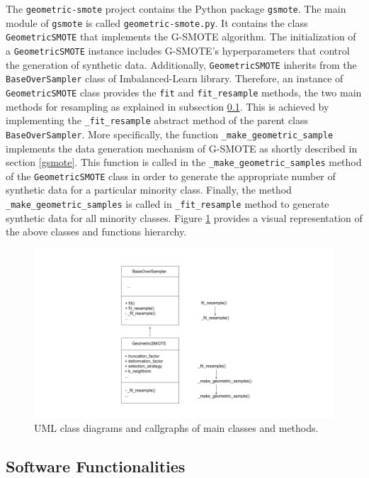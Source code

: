 \documentclass[preprint,12pt, a4paper]{elsarticle}
\begin{document}
The \texttt{geometric-smote} project contains the Python package \texttt{gsmote}. The main module of \texttt{gsmote} is called \texttt{geometric-smote.py}. It contains the class \texttt{GeometricSMOTE} that implements the G-SMOTE algorithm. The initialization of a \texttt{GeometricSMOTE} instance includes G-SMOTE's hyperparameters that control the generation of synthetic data. Additionally, \texttt{GeometricSMOTE} inherits from the \texttt{BaseOverSampler} class of Imbalanced-Learn library. Therefore, an instance of \texttt{GeometricSMOTE} class provides the \texttt{fit} and \texttt{fit\_resample} methods, the two main methods for resampling as explained in subsection \ref{functionality}. This is achieved by implementing the \texttt{\_fit\_resample} abstract method of the parent class \texttt{BaseOverSampler}. More specifically, the function \texttt{\_make\_geometric\_sample} implements the data generation mechanism of G-SMOTE as shortly described in section \ref{gsmote}. This function is called in the \texttt{\_make\_geometric\_samples} method of the \texttt{GeometricSMOTE} class in order to generate the appropriate number of synthetic data for a particular minority class. Finally, the method \texttt{\_make\_geometric\_samples} is called in \texttt{\_fit\_resample} method to generate synthetic data for all minority classes. Figure \ref{fig:class_diagram} provides a visual representation of the above classes and functions hierarchy.

\begin{figure}[H]
	\centering
	\includegraphics[width=1\linewidth]{../analysis/class_diagram}
	\caption{UML class diagrams and callgraphs of main classes and methods.}
	\label{fig:class_diagram}
\end{figure}

\subsection{Software Functionalities}
\label{functionality}
\end{document}
